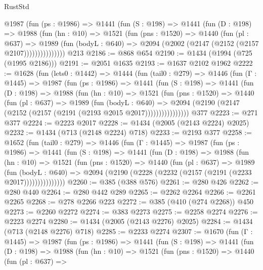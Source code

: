 \begin{lexlean}{RustStd}
\begin{coremodule}
          @1987
            (fun (ps : @1986) =>
            @1441
              (fun (S : @198) =>
              @1441
                (fun (D : @198) =>
                @1988
                  (fun (hn : @10) =>
                  @1521
                    (fun (pns : @1520) =>
                    @1440
                      (fun (pl : @637) =>
                      @1989
                        (fun (bodyL : @640) =>
                        @2094 (@2002 (@2147 (@2152 (@2157 @2107)))))))))))))))
    @213
@2186 := @868 @654
@2190 := @1434 (@1994 (@725 (@1995 @2186)))
@2191 := @2051 @1635
@2193 := @1637 @2102 @1962
@2222 := @1628
    (fun (lets0 : @1442) =>
    @1444
      (fun (tail0 : @279) =>
      @1446
        (fun (Γ : @1445) =>
        @1987
          (fun (ps : @1986) =>
          @1441
            (fun (S : @198) =>
            @1441
              (fun (D : @198) =>
              @1988
                (fun (hn : @10) =>
                @1521
                  (fun (pns : @1520) =>
                  @1440
                    (fun (pl : @637) =>
                    @1989
                      (fun (bodyL : @640) =>
                      @2094 (@2190 (@2147 (@2152 (@2157 (@2191 (@2193 @2015 @2017))))))))))))))))
    @377
@2223 := @271 @377
@2224 := @2223 @2017
@2228 := @1434 (@2005 (@2143 @2224) @2025)
@2232 := @1434 (@713 (@2148 @2224) @718)
@2233 := @2193 @377
@2258 := @1652
    (fun (tail0 : @279) =>
    @1446
      (fun (Γ : @1445) =>
      @1987
        (fun (ps : @1986) =>
        @1441
          (fun (S : @198) =>
          @1441
            (fun (D : @198) =>
            @1988
              (fun (hn : @10) =>
              @1521
                (fun (pns : @1520) =>
                @1440
                  (fun (pl : @637) =>
                  @1989
                    (fun (bodyL : @640) =>
                    @2094 (@2190 (@2228 (@2232 (@2157 (@2191 (@2233 @2017)))))))))))))))
@2260 := @385 (@388 @576)
@2261 := @280 @426
@2262 := @280 @440
@2264 := @280 @442 @289
@2265 := @2262 @2264
@2266 := @2261 @2265
@2268 := @278 @2266 @223
@2272 := @385 (@410 (@274 @2268)) @450
@2273 := @2260 @2272
@2274 := @383 @2273
@2275 := @2258 @2274
@2276 := @2223 @2274
@2280 := @1434 (@2005 (@2143 @2276) @2025)
@2284 := @1434 (@713 (@2148 @2276) @718)
@2285 := @2233 @2274
@2307 := @1670
    (fun (Γ : @1445) =>
    @1987
      (fun (ps : @1986) =>
      @1441
        (fun (S : @198) =>
        @1441
          (fun (D : @198) =>
          @1988
            (fun (hn : @10) =>
            @1521
              (fun (pns : @1520) =>
              @1440
                (fun (pl : @637) =>

\end{coremodule}
\end{lexlean}
